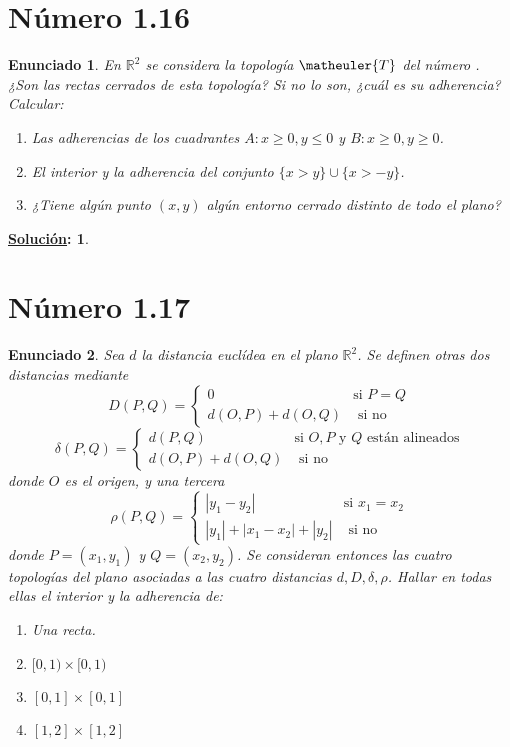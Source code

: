 \documentclass[10pt,a4paper,openright]{book}
\theoremstyle{break}
\newtheorem*{enun}{Enunciado}
\newtheorem*{sol}{\underline{Solución}:}
\begin{document}
\section*{Número 1.16}
\begin{enun}
En $\mathbb{R}^2$ se considera la topología $\matheuler{T}$ del número {}. ¿Son las rectas cerrados de esta topología? Si no lo son, ¿cuál es su adherencia? Calcular:
\begin{enumerate}[label={(\arabic*)}]
\item Las adherencias de los cuadrantes $A: x \geq 0, y \leq 0$ y $B: x \geq 0, y \geq 0$.
\item El interior y la adherencia del conjunto $\{x > y\}\cup\{x > -y\}$.
\item ¿Tiene algún punto $(x,y)$ algún entorno cerrado distinto de todo el plano?
\end{enumerate}
\end{enun}
\begin{sol}
\end{sol}

\section*{Número 1.17}
\begin{enun}
Sea $d$ la distancia euclídea en el plano $\mathbb{R}^2$. Se definen otras dos distancias mediante $$D(P,Q) = \begin{cases} 0 & \mbox{si } P = Q \\ d(O,P) + d(O,Q) & \mbox{ si no} \end{cases}$$
$$\delta(P,Q) = \begin{cases} d(P,Q) & \mbox{si } O,P \mbox{ y } Q \mbox{ están alineados} \\ d(O,P) + d(O,Q) & \mbox{ si no} \end{cases}$$
donde $O$ es el origen, y una tercera 
$$\rho(P,Q) = \begin{cases} |y_1 - y_2| & \mbox{si } x_1 = x_2  \\ |y_1| + |x_1 - x_2| + |y_2| & \mbox{ si no}\end{cases}$$
donde $P = (x_1,y_1)$ y $Q = (x_2,y_2)$. Se consideran entonces las cuatro topologías del plano asociadas a las cuatro distancias $d,D,\delta,\rho$. Hallar en todas ellas el interior y la adherencia de:
\begin{enumerate}[label={(\arabic*)}]
\item Una recta.
\item $[0,1) \times [0,1)$
\item $[0,1] \times [0,1]$
\item $[1,2] \times [1,2]$
\end{enumerate}
\end{enun}
\end{document}
